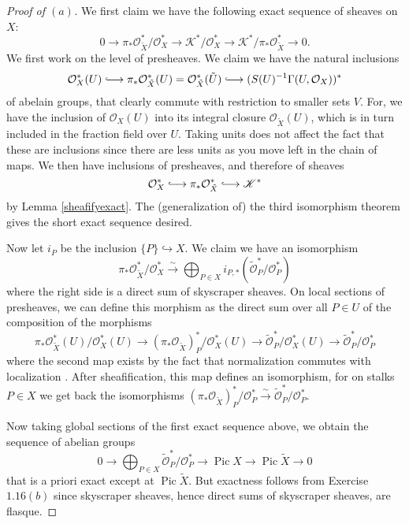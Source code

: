 \documentclass[10pt]{article}
\theoremstyle{definition}
\theoremstyle{remark}
\numberwithin{equation}{section}
\numberwithin{figure}{subsubsection}
\newcommand*{\longhookrightarrow}{\ensuremath{\lhook\joinrel\relbar\joinrel\rightarrow}}
\DeclareMathOperator{\Pic}{Pic}
\newcommand{\OO}{\mathcal{O}}
\newcommand{\isoto}{\overset{\sim}{\to}}
\begin{document}
\begin{proof}[Proof of $(a)$]
  We first claim we have the following exact sequence of sheaves on $X$:
  \begin{equation*}
    0 \longrightarrow \pi_*\OO_{\tilde{X}}^*/\OO_X^*
    \longrightarrow \mathscr{K}^*/\OO_X^* \longrightarrow
    \mathscr{K}^*/\pi_*\OO_{\tilde{X}}^*
    \longrightarrow 0.
  \end{equation*}
  We first work on the level of presheaves. We claim we have the natural inclusions
  \[\OO_X^*(U) \longhookrightarrow \pi_*\OO_{\tilde{X}}^*(U) =
  \OO_{\tilde{X}}^*(\tilde{U}) \longhookrightarrow (S(U)^{-1}\Gamma(U,\OO_X))^*\]
  of abelain groups, that clearly commute with restriction to smaller sets $V$.
  For, we have the inclusion of $\OO_X(U)$ into its integral closure
  $\OO_{\tilde{X}}(U)$, which is in turn included in the fraction field over
  $U$. Taking units does not affect the fact that these are inclusions since
  there are less units as you move left in the chain of maps.
  We then have inclusions of presheaves, and therefore of sheaves
  \[\OO_X^* \longhookrightarrow \pi_*\OO_{\tilde{X}}^* \longhookrightarrow
  \mathscr{K}^*\]
  by Lemma \ref{sheafifyexact}. The (generalization of) the third isomorphism
  theorem gives the short exact sequence desired.
  \par Now let $i_P$ be the inclusion $\{P\} \hookrightarrow X$. We claim we
  have an isomorphism
  \[ \pi_*\OO_{\tilde{X}}^*/\OO_X^* \overset{\sim}{\longrightarrow}
    \bigoplus_{P \in X} i_{P,*}\left(\tilde{\OO}_P^*/\OO_P^*\right) \]
  where the right side is a direct sum of skyscraper sheaves. On local sections
  of presheaves, we can define this morphism as the direct sum over all $P \in
  U$ of the composition of the morphisms
  \begin{equation*}
    \pi_*\OO_{\tilde{X}}^*(U)/\OO_{X}^*(U) \longrightarrow
    (\pi_*\OO_{\tilde{X}})^*_P/\OO_X^*(U) \longrightarrow
    \tilde{\OO}_{P}^*/\OO_X^*(U) \longrightarrow \tilde{\OO}_{P}^*/\OO_P^*
  \end{equation*}
  where the second map exists by the fact that normalization commutes with
  localization \cite[Prop.\ 5.12]{AM69}. After sheafification, this map
  defines an isomorphism, for on stalks $P \in X$ we get back the isomorphisms
  $(\pi_*\OO_{\tilde{X}})^*_P/\OO_P^* \isoto \tilde{\OO}_{P}^*/\OO_P^*$.
  \par Now taking global sections of the first exact sequence above, we obtain
  the sequence of abelian groups
  \begin{equation*}
    0 \longrightarrow \bigoplus_{P \in X} \tilde{\OO}_P^*/\OO_P^*
    \longrightarrow \Pic X \longrightarrow \Pic \tilde{X}
    \longrightarrow 0
  \end{equation*}
  that is a priori exact except at $\Pic\tilde{X}$. But exactness follows from
  Exercise $1.16(b)$ since skyscraper sheaves, hence direct sums of skyscraper
  sheaves, are flasque.
\end{proof}
\end{document}
